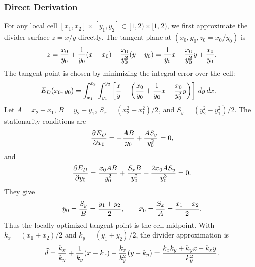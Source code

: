 \documentclass[conference]{IEEEtran}
\begin{document}
\subsubsection{Direct Derivation}
For any local cell $[x_1,x_2]\times[y_1,y_2]\subset[1,2)\times[1,2)$, we first
approximate the divider surface $z=x/y$ directly. The tangent plane at
$(x_0,y_0,z_0=x_0/y_0)$ is
\begin{equation}
z={x_0\over y_0}+{1\over y_0}(x-x_0)-{x_0\over y_0^2}(y-y_0)
={1\over y_0}x-{x_0\over y_0^2}y+{x_0\over y_0}.
\end{equation}
The tangent point is chosen by minimizing the integral error over the cell:
\begin{equation}
\begin{aligned}
E_D(x_0,y_0)
&=\int_{x_1}^{x_2}\int_{y_1}^{y_2}
\left[{x\over y}-\left({x_0\over y_0}+{1\over y_0}x
-{x_0\over y_0^2}y\right)\right]\,dy\,dx .
\end{aligned}
\end{equation}
Let $A=x_2-x_1$, $B=y_2-y_1$, $S_x=(x_2^2-x_1^2)/2$, and
$S_y=(y_2^2-y_1^2)/2$. The stationarity conditions are
\begin{equation}
{\partial E_D\over\partial x_0}=-{AB\over y_0}+{A S_y\over y_0^2}=0,
\end{equation}
and
\begin{equation}
{\partial E_D\over\partial y_0}=
{x_0AB\over y_0^2}+{S_xB\over y_0^2}-{2x_0A S_y\over y_0^3}=0.
\end{equation}
They give
\begin{equation}
y_0={S_y\over B}={y_1+y_2\over2},\qquad
x_0={S_x\over A}={x_1+x_2\over2}.
\end{equation}
Thus the locally optimized tangent point is the cell midpoint. With
$k_x=(x_1+x_2)/2$ and $k_y=(y_1+y_2)/2$, the divider approximation is
\begin{equation}
\widehat{d}={k_x\over k_y}+{1\over k_y}(x-k_x)-{k_x\over k_y^2}(y-k_y)
={k_xk_y+k_yx-k_xy\over k_y^2}.
\label{eq:direct_divider_plane}
\end{equation}
\end{document}
